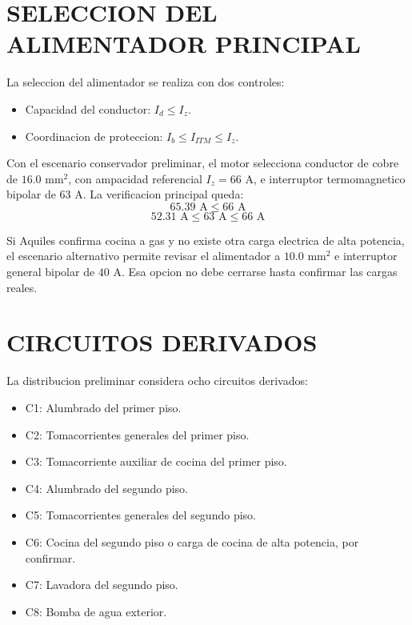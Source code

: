 \section{SELECCION DEL ALIMENTADOR PRINCIPAL}

La seleccion del alimentador se realiza con dos controles:
\begin{itemize}
  \item Capacidad del conductor: \(I_d \leq I_z\).
  \item Coordinacion de proteccion: \(I_b \leq I_{ITM} \leq I_z\).
\end{itemize}

Con el escenario conservador preliminar, el motor selecciona conductor de cobre de \(16.0\text{ mm}^2\), con ampacidad referencial \(I_z=66\text{ A}\), e interruptor termomagnetico bipolar de \(63\text{ A}\). La verificacion principal queda:
\begin{equation}
65.39\text{ A}\leq66\text{ A}
\end{equation}
\begin{equation}
52.31\text{ A}\leq63\text{ A}\leq66\text{ A}
\end{equation}

Si Aquiles confirma cocina a gas y no existe otra carga electrica de alta potencia, el escenario alternativo permite revisar el alimentador a \(10.0\text{ mm}^2\) e interruptor general bipolar de \(40\text{ A}\). Esa opcion no debe cerrarse hasta confirmar las cargas reales.

\section{CIRCUITOS DERIVADOS}

La distribucion preliminar considera ocho circuitos derivados:
\begin{itemize}
  \item C1: Alumbrado del primer piso.
  \item C2: Tomacorrientes generales del primer piso.
  \item C3: Tomacorriente auxiliar de cocina del primer piso.
  \item C4: Alumbrado del segundo piso.
  \item C5: Tomacorrientes generales del segundo piso.
  \item C6: Cocina del segundo piso o carga de cocina de alta potencia, por confirmar.
  \item C7: Lavadora del segundo piso.
  \item C8: Bomba de agua exterior.
\end{itemize}

